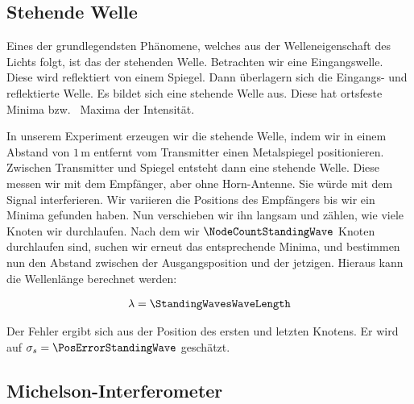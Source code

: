 \documentclass[a4paper,10pt,twocolumn]{article}
\begin{document}
    \subsection{Stehende Welle}
    
    Eines der grundlegendsten Phänomene, welches aus der Welleneigenschaft des Lichts folgt, ist das der stehenden Welle.
    Betrachten wir eine Eingangswelle.
    Diese wird reflektiert von einem Spiegel.
    Dann überlagern sich die Eingangs- und reflektierte Welle.
    Es bildet sich eine stehende Welle aus.
    Diese hat ortsfeste Minima bzw. \ Maxima der Intensität.
    
    In unserem Experiment erzeugen wir die stehende Welle, indem wir in einem Abstand von $1\, \mathrm{m}$ entfernt
    vom Transmitter einen Metalspiegel positionieren.
    Zwischen Transmitter und Spiegel entsteht dann eine stehende Welle.
    Diese messen wir mit dem Empfänger, aber ohne Horn-Antenne.
    Sie würde mit dem Signal interferieren.
    Wir variieren die Positions des Empfängers bis wir ein Minima gefunden haben.
    Nun verschieben wir ihn langsam und zählen, wie viele Knoten wir durchlaufen.
    Nach dem wir $\NodeCountStandingWave$ Knoten durchlaufen sind, suchen wir erneut das entsprechende Minima, und 
    bestimmen nun den Abstand zwischen der Ausgangsposition und der jetzigen. 
    Hieraus kann die Wellenlänge berechnet werden:
    
    \begin{align*}
        \lambda = \StandingWavesWaveLength
    \end{align*}
    
    Der Fehler ergibt sich aus der Position des ersten und letzten Knotens.
    Er wird auf $\sigma_s = \PosErrorStandingWave$ geschätzt.
    
    \subsection{Michelson-Interferometer}
\end{document}
